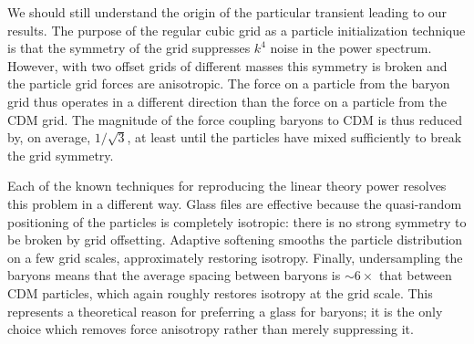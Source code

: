 \documentclass[a4paper,11pt]{article}
\newcommand{\YF}[1]{\textcolor{green}{[\bf YF: #1]} }
\begin{document}
We should still understand the origin of the particular transient leading to our results. The purpose of the regular cubic grid as a particle initialization technique is that the symmetry of the grid suppresses $k^4$ noise in the power spectrum. However, with two offset grids of different masses this symmetry is broken and the particle grid forces are anisotropic. The force on a particle from the baryon grid thus operates in a different direction than the force on a particle from the CDM grid. The magnitude of the force coupling baryons to CDM is thus reduced by, on average, $1/\sqrt{3}$, at least until the particles have mixed sufficiently to break the grid symmetry.

Each of the known techniques for reproducing the linear theory power resolves this problem in a different way. Glass files are effective because the quasi-random positioning of the particles is completely isotropic: there is no strong symmetry to be broken by grid offsetting. Adaptive softening smooths the particle distribution on a few grid scales, approximately restoring isotropy. Finally, undersampling the baryons means that the average spacing between baryons is $\sim 6\times$ that between CDM particles, which again roughly restores isotropy at the grid scale. This represents a theoretical reason for preferring a glass for baryons; it is the only choice which removes force anisotropy rather than merely suppressing it.



\end{document}
